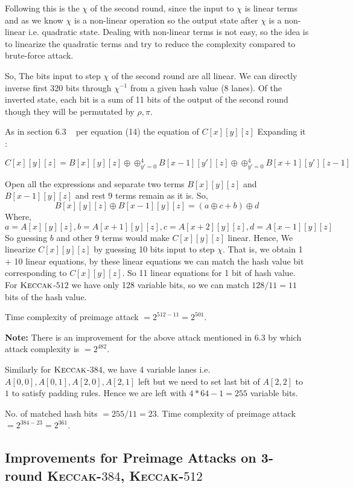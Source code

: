 \documentclass[runningheads]{llncs}
\newcommand{\KECCAK}{\mbox{\textsc{Keccak}}}
\begin{document}
		Following this is the $\chi$ of the second round, since the input to $\chi$ is linear terms and as we know $\chi$ is a non-linear operation so the output state after $\chi$ is a non-linear i.e. quadratic state. Dealing with non-linear terms is not easy, so the idea is to linearize the quadratic terms and try to reduce the complexity compared to brute-force attack.

		So, The bits input to step $\chi$ of the second round are all linear. We can directly inverse first 320 bits through $\chi^{-1}$ from a given hash value (8 lanes). Of the inverted state, each bit is a sum of 11 bits of the output of the second round though they will be permutated by $\rho, \pi$.

    As in section 6.3 ~\cite{guo2016linear} per equation (14) the equation of $C[x][y][z]$
    Expanding it :

    \[
        C[x][y][z] = B[x][y][z] \oplus \oplus_{y' = 0}^{4} B[x-1][y'][z] \oplus \oplus_{y' = 0}^{4} B[x+1][y'][z-1]
    \]
    
		Open all the expressions and separate two terms $B[x][y][z]$ and $B[x-1][y][z]$ and rest 9 terms remain as it is.
    So, 
		\[ B[x][y][z] \oplus B[x-1][y][z] = (a \oplus c + b) \oplus d
    \]
    Where,
		 \[
        a = A[x][y][z], b = A[x + 1][y][z], c = A[x + 2][y][z], d = A[x - 1][y][z]
    \]
    So guessing $b$ and other 9 terms would make $C[x][y][z]$ linear. Hence, We linearize $C[x][y][z]$ by guessing 10 bits input to step $\chi$. That is, we obtain 1 + 10 linear equations, by these linear equations we can match the hash value bit corresponding to $C[x][y][z]$. So 11 linear equations for 1 bit of hash value. For $\KECCAK$-$512$ we have only 128 variable bits, so we can match $128/11 = 11$ bits of the hash value.
    
    Time complexity of preimage attack $= 2^{512 - 11} = 2^{501}$.

    \textbf{Note:} There is an improvement for the above attack mentioned in 6.3 by which attack complexity is $= 2^{482}$.

    Similarly for $\KECCAK$-$384$, we have 4 variable lanes i.e. $A[0,0], A[0,1], A[2,0], A[2,1]$ left but we need to set last bit of $A[2,2]$ to $1$ to satisfy padding rules. Hence we are left with $4*64 - 1 = 255$ variable bits.
	
	No. of matched hash bits $ = 255/11 = 23 $. Time complexity of preimage attack $= 2^{384 - 23} = 2^{361}$.

\subsection{Improvements for Preimage Attacks on 3-round \KECCAK-$384$, \KECCAK-$512$}
\end{document}

